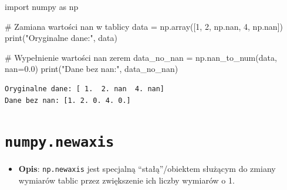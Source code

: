 \documentclass[
  polish,
  letterpaper,
  DIV=11,
  numbers=noendperiod]{scrreprt}
\newenvironment{Shaded}{\begin{snugshade}}{\end{snugshade}}
\newcommand{\BuiltInTok}[1]{\textcolor[rgb]{0.00,0.23,0.31}{#1}}
\newcommand{\CommentTok}[1]{\textcolor[rgb]{0.37,0.37,0.37}{#1}}
\newcommand{\DecValTok}[1]{\textcolor[rgb]{0.68,0.00,0.00}{#1}}
\newcommand{\FloatTok}[1]{\textcolor[rgb]{0.68,0.00,0.00}{#1}}
\newcommand{\ImportTok}[1]{\textcolor[rgb]{0.00,0.46,0.62}{#1}}
\newcommand{\NormalTok}[1]{\textcolor[rgb]{0.00,0.23,0.31}{#1}}
\newcommand{\OperatorTok}[1]{\textcolor[rgb]{0.37,0.37,0.37}{#1}}
\newcommand{\StringTok}[1]{\textcolor[rgb]{0.13,0.47,0.30}{#1}}
\providecommand{\tightlist}{%
  \setlength{\itemsep}{0pt}\setlength{\parskip}{0pt}}
\begin{document}
\begin{Shaded}
\begin{Highlighting}[]
\ImportTok{import}\NormalTok{ numpy }\ImportTok{as}\NormalTok{ np}

\CommentTok{\# Zamiana wartości nan w tablicy}
\NormalTok{data }\OperatorTok{=}\NormalTok{ np.array([}\DecValTok{1}\NormalTok{, }\DecValTok{2}\NormalTok{, np.nan, }\DecValTok{4}\NormalTok{, np.nan])}
\BuiltInTok{print}\NormalTok{(}\StringTok{"Oryginalne dane:"}\NormalTok{, data)}

\CommentTok{\# Wypełnienie wartości nan zerem}
\NormalTok{data\_no\_nan }\OperatorTok{=}\NormalTok{ np.nan\_to\_num(data, nan}\OperatorTok{=}\FloatTok{0.0}\NormalTok{)}
\BuiltInTok{print}\NormalTok{(}\StringTok{"Dane bez nan:"}\NormalTok{, data\_no\_nan)}
\end{Highlighting}
\end{Shaded}

\begin{verbatim}
Oryginalne dane: [ 1.  2. nan  4. nan]
Dane bez nan: [1. 2. 0. 4. 0.]
\end{verbatim}

\section{\texorpdfstring{\texttt{numpy.newaxis}}{numpy.newaxis}}\label{numpy.newaxis}

\begin{itemize}
\tightlist
\item
  \textbf{Opis}: \texttt{np.newaxis} jest specjalną ``stałą''/obiektem
  służącym do zmiany wymiarów tablic przez zwiększenie ich liczby
  wymiarów o 1.
\end{itemize}
\end{document}
